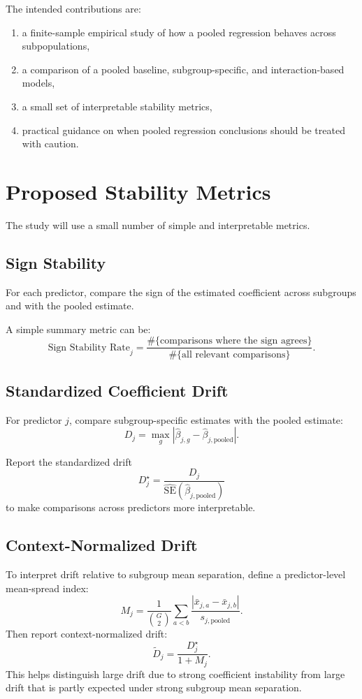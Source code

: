 \documentclass[11pt]{article}
\begin{document}
The intended contributions are:
\begin{enumerate}[label=(\arabic*)]
    \item a finite-sample empirical study of how a pooled regression behaves across subpopulations,
    \item a comparison of a pooled baseline, subgroup-specific, and interaction-based models,
    \item a small set of interpretable stability metrics,
    \item practical guidance on when pooled regression conclusions should be treated with caution.
\end{enumerate}

\section{Proposed Stability Metrics}
The study will use a small number of simple and interpretable metrics.

\subsection{Sign Stability}
For each predictor, compare the sign of the estimated coefficient across subgroups and with the pooled estimate.

A simple summary metric can be:
\[
\text{Sign Stability Rate}_j
=
\frac{\#\{\text{comparisons where the sign agrees}\}}{\#\{\text{all relevant comparisons}\}}.
\]

\subsection{Standardized Coefficient Drift}
For predictor $j$, compare subgroup-specific estimates with the pooled estimate:
\[
D_j = \max_g \left| \hat{\beta}_{j,g} - \hat{\beta}_{j,\mathrm{pooled}} \right|.
\]

Report the standardized drift
\[
D_j^{\star} = \frac{D_j}{\widehat{\mathrm{SE}}\!\left(\hat{\beta}_{j,\mathrm{pooled}}\right)}
\]
to make comparisons across predictors more interpretable.

\subsection{Context-Normalized Drift}
To interpret drift relative to subgroup mean separation, define a predictor-level mean-spread index:
\[
M_j = \frac{1}{\binom{G}{2}} \sum_{a<b} \frac{\left|\bar{x}_{j,a} - \bar{x}_{j,b}\right|}{s_{j,\mathrm{pooled}}}.
\]
Then report context-normalized drift:
\[
\widetilde{D}_j = \frac{D_j^{\star}}{1 + M_j}.
\]
This helps distinguish large drift due to strong coefficient instability from large drift that is partly expected under strong subgroup mean separation.
\end{document}
